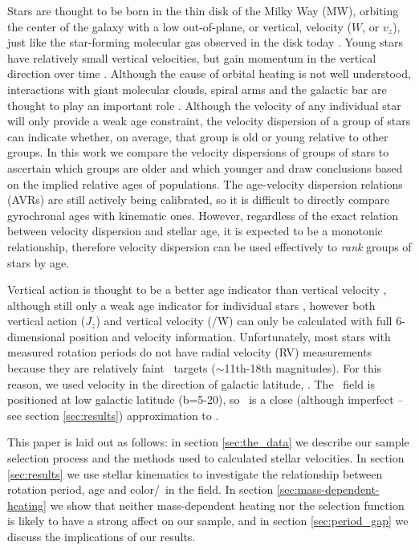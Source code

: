 Stars are thought to be born in the thin disk of the Milky Way (MW), orbiting
the center of the galaxy with a low out-of-plane, or vertical, velocity ($W$,
or $v_z$), just like the star-forming molecular gas observed in the disk today
\citep[\eg][]{stark1989, stark2005, aumer2009, martig2014, aumer2016}.
Young stars have relatively small vertical velocities, but gain momentum in
the vertical direction over time \citep[\eg][]{nordstrom2004, holmberg2007,
holmberg2009, aumer2009, casagrande2011}.
Although the cause of orbital heating is not well understood, interactions
with giant molecular clouds, spiral arms and the galactic bar are thought to
play an important role \citep[see][for a review of secular evolution in the
MW]{sellwood2014}.
Although the velocity of any individual star will only provide a weak age
constraint, the velocity dispersion of a group of stars can indicate whether,
on average, that group is old or young relative to other groups.
In this work we compare the velocity dispersions of groups of stars to
ascertain which groups are older and which younger and draw conclusions based
on the implied relative ages of populations.
The age-velocity dispersion relations (AVRs) are still actively being
calibrated, so it is difficult to directly compare gyrochronal ages with
kinematic ones.
However, regardless of the exact relation between velocity dispersion and
stellar age, it is expected to be a monotonic relationship, therefore velocity
dispersion can be used effectively to {\it rank} groups of stars by age.

Vertical action is thought to be a better age indicator than vertical velocity
\citep{ting2019}, although still only a weak age indicator for individual
stars \citep{beane2018}, however both vertical action ($J_z$) and vertical
velocity (\vz/W) can only be calculated with full 6-dimensional position and
velocity information.
Unfortunately, most stars with measured rotation periods do not have radial
velocity (RV) measurements because they are relatively faint \kepler\ targets
($\sim$11th-18th magnitudes).
For this reason, we used velocity in the direction of galactic latitude, \vb.
The \kepler\ field is positioned at low galactic latitude (b=5-20\degrees), so
\vb\ is a close (although imperfect -- see section \ref{sec:results})
approximation to \vz.


This paper is laid out as follows: in section \ref{sec:the_data} we describe
our sample selection process and the methods used to calculated stellar
velocities.
In section \ref{sec:results} we use stellar kinematics to investigate the
relationship between rotation period, age and color/\teff\ in the field.
In section \ref{sec:mass-dependent-heating} we show that neither
mass-dependent heating nor the selection function is likely to have a strong
affect on our sample, and in section \ref{sec:period_gap} we discuss the
implications of our results.
